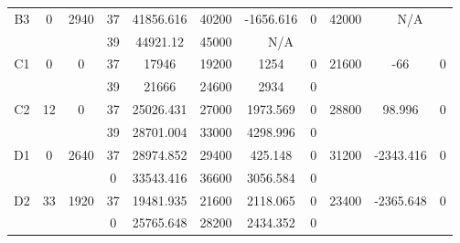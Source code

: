 \begin{sidewaystable}
\begin{tabular}{c||c|c||c|c|c|c|c||c|c|c}
         &
        
      \\
      \hline
      \multirow{2}{*}{B3} &
      \multirow{2}{*}{0} &
      \multirow{2}{*}{2940} &
      37 &
      41856.616 &
      40200 &
        -1656.616 &
        0 &
      \multirow{2}{*}{42000} &
        \multicolumn{2}{c}{\multirow{2}{*}{N/A}}
      \\
      \cline{4-8}
       &
       &
       &
      39 &
      44921.12 &
      45000 &
        \multicolumn{2}{|c||}{N/A} &
      
        
      \\
      \hline
      \multirow{2}{*}{C1} &
      \multirow{2}{*}{0} &
      \multirow{2}{*}{0} &
      37 &
      17946 &
      19200 &
        1254 &
        0 &
      \multirow{2}{*}{21600} &
        \multirow{2}{*}{-66} &
        \multirow{2}{*}{0}
      \\
      \cline{4-8}
       &
       &
       &
      39 &
      21666 &
      24600 &
        2934 &
        0 &
      
         &
        
      \\
      \hline
      \multirow{2}{*}{C2} &
      \multirow{2}{*}{12} &
      \multirow{2}{*}{0} &
      37 &
      25026.431 &
      27000 &
        1973.569 &
        0 &
      \multirow{2}{*}{28800} &
        \multirow{2}{*}{98.996} &
        \multirow{2}{*}{0}
      \\
      \cline{4-8}
       &
       &
       &
      39 &
      28701.004 &
      33000 &
        4298.996 &
        0 &
      
         &
        
      \\
      \hline
      \multirow{2}{*}{D1} &
      \multirow{2}{*}{0} &
      \multirow{2}{*}{2640} &
      37 &
      28974.852 &
      29400 &
        425.148 &
        0 &
      \multirow{2}{*}{31200} &
        \multirow{2}{*}{-2343.416} &
        \multirow{2}{*}{0}
      \\
      \cline{4-8}
       &
       &
       &
      0 &
      33543.416 &
      36600 &
        3056.584 &
        0 &
      
         &
        
      \\
      \hline
      \multirow{2}{*}{D2} &
      \multirow{2}{*}{33} &
      \multirow{2}{*}{1920} &
      37 &
      19481.935 &
      21600 &
        2118.065 &
        0 &
      \multirow{2}{*}{23400} &
        \multirow{2}{*}{-2365.648} &
        \multirow{2}{*}{0}
      \\
      \cline{4-8}
       &
       &
       &
      0 &
      25765.648 &
      28200 &
        2434.352 &
        0 &
      

\end{tabular}
\end{sidewaystable}
